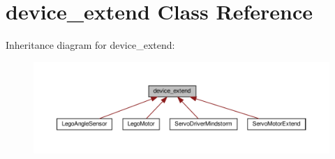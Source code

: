 \hypertarget{classdevice__extend}{}\section{device\+\_\+extend Class Reference}
\label{classdevice__extend}


Inheritance diagram for device\+\_\+extend\+:
\nopagebreak
\begin{figure}[H]
\begin{center}
\leavevmode
\includegraphics[width=350pt]{classdevice__extend__inherit__graph}
\end{center}
\end{figure}
